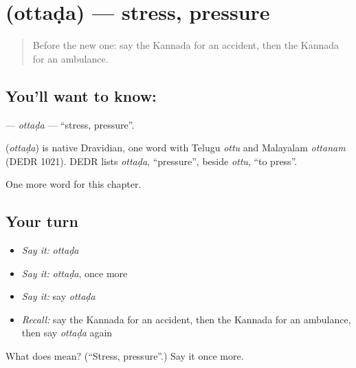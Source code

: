 \section[\texorpdfstring{\kn{ಒತ್ತಡ} (ottaḍa)}{ಒತ್ತಡ (ottaḍa)}]{ (ottaḍa) — stress, pressure}

\label{lesson:KA-C282-ottada}



\begin{quote}
Before the new one: say the Kannada for an accident, then the Kannada for an ambulance.
\end{quote}

\subsection*{You'll want to know: }
\textbf{} — \emph{ottaḍa} — \textquotedblleft{}stress, pressure\textquotedblright{}.

\begin{cousinweb}
\textbf{} (\emph{ottaḍa}) is native Dravidian, one word with Telugu \emph{ottu} and Malayalam \emph{ottanam} (DEDR 1021). DEDR lists \emph{ottaḍa}, \textquotedblleft{}pressure\textquotedblright{}, beside \emph{ottu}, \textquotedblleft{}to press\textquotedblright{}.
\end{cousinweb}

\begin{grammarlens}[title={What you've built}]
One more word for this chapter.
\end{grammarlens}

\subsection*{Your turn}
\begin{itemize}
\raggedright
  \item \emph{Say it:} \emph{ottaḍa}
  \item \emph{Say it:} \emph{ottaḍa}, once more
  \item \emph{Say it:} say \emph{ottaḍa}
  \item \emph{Recall:} say the Kannada for an accident, then the Kannada for an ambulance, then say \emph{ottaḍa} again
\end{itemize}

\begin{tcolorbox}[breakable,colback=teal!4,colframe=teal!35!black,title={Before you move on}]
What does  mean? (\textquotedblleft{}Stress, pressure\textquotedblright{}.) Say it once more.
\end{tcolorbox}
